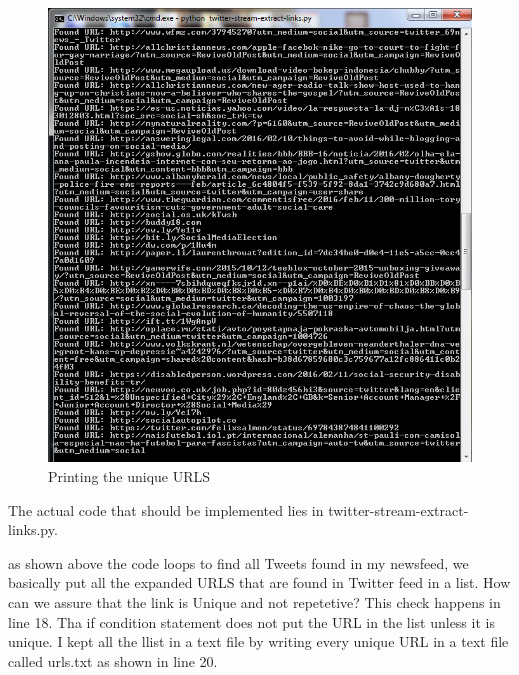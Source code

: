 \documentclass{article}
\begin{document}

\begin{figure}
\centering
\includegraphics[scale=0.75]{cmd-Q1.png}
\caption{Printing the unique URLS}
\label{fig:cmd-Q1}
\end{figure}
The actual code that should be implemented lies in twitter-stream-extract-links.py.


as shown above the code loops to find all Tweets found in my newsfeed, we basically put all the expanded URLS that are found in Twitter feed in a list. How can we assure that the link is Unique and not repetetive? This check happens in line 18. Tha if condition statement does not put the URL in the list unless it is unique.
I kept all the llist in a text file by writing every unique URL in a text file called urls.txt as shown in line 20.
\end{document}
